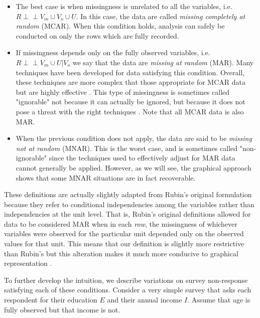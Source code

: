 \documentclass[12pt,twoside]{reedthesis}
\theoremstyle{definition}
\newcommand{\dsep}{\perp \!\!\!\perp}
\begin{document}
\begin{itemize}
\item The best case is when missingness is unrelated to all the variables, i.e. $R \dsep V_m \cup V_o \cup U$. In this case, the data are called \emph{missing completely at random} (MCAR). When this condition holds, analysis can safely be conducted on only the rows which are fully recorded.

\item If missingness depends only on the fully observed variables, i.e.  $R \dsep V_m \cup U | V_o$ we say that the data are \emph{missing at random} (MAR). Many techniques have been developed for data satisfying this condition. Overall, these techniques are more complex that those appropriate for MCAR data but are highly effective \citep{Schafer_2002}. This type of missingness is sometimes called "ignorable" not because it can actually be ignored, but because it does not pose a threat with the right techniques \citep{Pearl_2019}. Note that all MCAR data is also MAR.

\item When  the previous condition does not apply, the data are said to be \emph{missing not at random} (MNAR). This is the worst case, and is sometimes called "non-ignorable" since the techniques used to effectively adjust for MAR data cannot generally be applied. However, as we will see, the graphical approach shows that some MNAR situations are in fact recoverable.
\end{itemize}

These definitions are actually slightly adapted from Rubin's original formulation because they refer to conditional independencies among the variables rather than independencies at the unit level. That is, Rubin's original definitions allowed for data to be considered MAR when in each \emph{row}, the missingness of whichever variables were observed for the particular unit depended only on the observed values for that unit. This means that our definition is slightly more restrictive than Rubin's but this alteration makes it much more conducive to graphical representation \citep{Mohan_2013} \citep{Schafer_2002}.

To further develop the intuition, we describe variations on survey non-response satisfying each of these conditions.  Consider a very simple survey that asks each respondent for their education $E$ and their annual income $I$. Assume that age is fully observed but that income is not.
\end{document}

